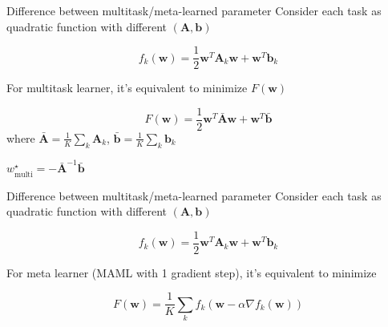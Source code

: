 \documentclass{beamer}
\begin{document}
\begin{frame}[t]{Difference between multitask/meta-learned parameter}
  Consider each task as quadratic function with different $(\mathbf{A}, \mathbf{b})$

  \begin{equation*}
    f_k(\mathbf{w}) = \frac{1}{2} \mathbf{w}^T \mathbf{A}_k \mathbf{w} + \mathbf{w}^T \mathbf{b}_k
  \end{equation*}

  For multitask learner, it's equivalent to minimize $F(\mathbf{w})$

  \begin{equation*}
    F(\mathbf{w}) =  \frac{1}{2} \mathbf{w}^T \bar{\mathbf{A}} \mathbf{w} + \mathbf{w}^T \bar{\mathbf{b}}
  \end{equation*}
  where $\bar{\mathbf{A}} = \frac{1}{K}\sum_k \mathbf{A}_k$, $\bar{\mathbf{b}} = \frac{1}{K}\sum_k \mathbf{b}_k$

  \center $\boxed{w^\star_{\text{multi}} = - \bar{\mathbf{A}}^{-1}\bar{\mathbf{b}}}$
\end{frame}
\begin{frame}[t]{Difference between multitask/meta-learned parameter}
  Consider each task as quadratic function with different $(\mathbf{A}, \mathbf{b})$

  \begin{equation*}
    f_k(\mathbf{w}) = \frac{1}{2} \mathbf{w}^T \mathbf{A}_k \mathbf{w} + \mathbf{w}^T \mathbf{b}_k
  \end{equation*}

  For meta learner (MAML with 1 gradient step), it's equivalent to minimize

  \begin{equation*}
    F(\mathbf{w}) =  \frac{1}{K} \sum_k f_k(\mathbf{w} - \alpha \nabla f_k(\mathbf{w})) 
  \end{equation*}
\end{frame}
\end{document}

